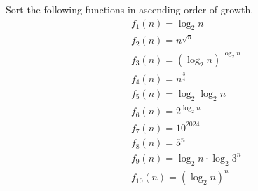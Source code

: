\problem{}

Sort the following functions in ascending order of growth.
\begin{align}
    &f_1(n)=\log_2{n} \\
    &f_2(n)=n^{\sqrt{n}} \\
    &f_3(n)=(\log_2{n})^{\log_2{n}} \\
    &f_4(n)=n^{\frac{3}{4}}  \\
    &f_5(n)=\log_2{\log_2{n}} \\
    &f_6(n)=2^{\log_2{n}}  \\
    &f_7(n)=10^{2024}  \\
    &f_8(n)=5^n \\
    &f_9(n)=\log_2{n}\cdot\log_2{3^n} \\
    &f_{10}(n)=(\log_2{n})^n
\end{align}











\newpage